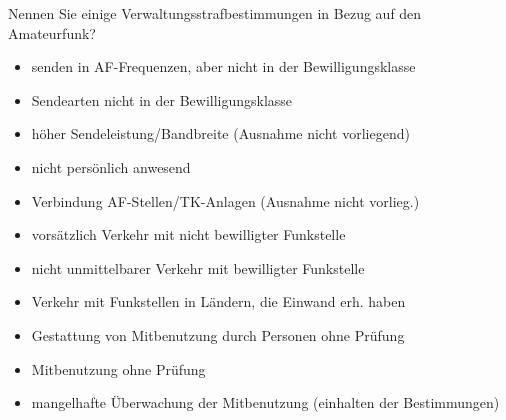 \documentclass[avery5371,grid,frame,a4paper]{flashcards}
\newcommand{\card}[3]{
  \begin{flashcard}[{\chap} -- #1]{#2}#3\end{flashcard}
}
\begin{document}
\card{37}{Nennen Sie einige Verwaltungsstrafbestimmungen in Bezug auf den Amateurfunk?}{
\footnotesize
  \begin{minipage}{0.48\textwidth}
  \begin{itemize}[leftmargin=10pt,itemsep=0pt]
    \item senden in AF-Frequenzen, aber nicht in der Bewilligungsklasse
    \item Sendearten nicht in der Bewilligungsklasse
    \item höher Sendeleistung/Bandbreite (Ausnahme nicht vorliegend)
    \item nicht persönlich anwesend
    \item Verbindung AF-Stellen/TK-Anlagen (Ausnahme nicht vorlieg.)
  \end{itemize}
  \end{minipage}
  \begin{minipage}{0.5\textwidth}
  \begin{itemize}[leftmargin=10pt,itemsep=0pt]
    \item vorsätzlich Verkehr mit nicht bewilligter Funkstelle
    \item nicht unmittelbarer Verkehr mit bewilligter Funkstelle
    \item Verkehr mit Funkstellen in Ländern, die Einwand erh. haben
    \item Gestattung von Mitbenutzung durch Personen ohne Prüfung
    \item Mitbenutzung ohne Prüfung
    \item mangelhafte Überwachung der Mitbenutzung (einhalten der Bestimmungen)
  \end{itemize}
  \end{minipage}
}
\end{document}
